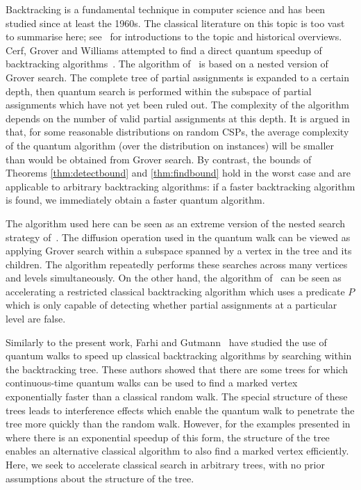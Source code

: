 \documentclass[11pt]{article}
\begin{document}
Backtracking is a fundamental technique in computer science and has been studied since at least the 1960s. The classical literature on this topic is too vast to summarise here; see~\cite{knuth75,freuder06,vanbeek06} for introductions to the topic and historical overviews. Cerf, Grover and Williams attempted to find a direct quantum speedup of backtracking algorithms~\cite{cerf00}. The algorithm of~\cite{cerf00} is based on a nested version of Grover search. The complete tree of partial assignments is expanded to a certain depth, then quantum search is performed within the subspace of partial assignments which have not yet been ruled out. The complexity of the algorithm depends on the number of valid partial assignments at this depth. It is argued in~\cite{cerf00} that, for some reasonable distributions on random CSPs, the average complexity of the quantum algorithm (over the distribution on instances) will be smaller than would be obtained from Grover search. By contrast, the bounds of Theorems \ref{thm:detectbound} and \ref{thm:findbound} hold in the worst case and are applicable to arbitrary backtracking algorithms: if a faster backtracking algorithm is found, we immediately obtain a faster quantum algorithm.

The algorithm used here can be seen as an extreme version of the nested search strategy of~\cite{cerf00}. The diffusion operation used in the quantum walk can be viewed as applying Grover search within a subspace spanned by a vertex in the tree and its children. The algorithm repeatedly performs these searches across many vertices and levels simultaneously. On the other hand, the algorithm of~\cite{cerf00} can be seen as accelerating a restricted classical backtracking algorithm which uses a predicate $P$ which is only capable of detecting whether partial assignments at a particular level are false.

Similarly to the present work, Farhi and Gutmann~\cite{farhi98} have studied the use of quantum walks to speed up classical backtracking algorithms by searching within the backtracking tree. These authors showed that there are some trees for which continuous-time quantum walks can be used to find a marked vertex exponentially faster than a classical random walk. The special structure of these trees leads to interference effects which enable the quantum walk to penetrate the tree more quickly than the random walk. However, for the examples presented in~\cite{farhi98} where there is an exponential speedup of this form, the structure of the tree enables an alternative classical algorithm to also find a marked vertex efficiently. Here, we seek to accelerate classical search in arbitrary trees, with no prior assumptions about the structure of the tree.
\end{document}
